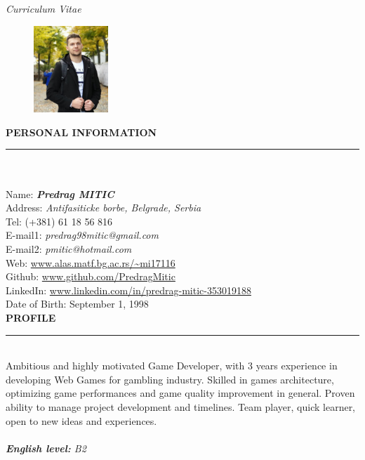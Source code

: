 \documentclass{article}
\begin{document}
\begin{center}
	\textit{\Huge Curriculum Vitae}   
	\vspace*{1cm}
\end{center}

\begin{figure} 
	\includegraphics[width=0.25\textwidth]{my_pic.jpeg}
\end{figure}

\color{my_col}
\textbf{\large PERSONAL INFORMATION}\\
\noindent\rule{10cm}{1.5pt}\color{black}\\ \\
Name:  \textbf{\emph{Predrag MITIC}} \\
Address: \emph{Antifasiticke borbe, Belgrade, Serbia }\\
Tel: 	(+381) 61 18 56 816 \\
E-mail1:	\textit{predrag98mitic@gmail.com} \\ 
E-mail2:	\textit{pmitic@hotmail.com} \\ 
Web:	\url{www.alas.matf.bg.ac.rs/~mi17116} \\
Github:	\url{www.github.com/PredragMitic} \\ 
LinkedIn: \url{www.linkedin.com/in/predrag-mitic-353019188}\\
Date of Birth: September 1, 1998 \\ 

\color{my_col}
\textbf{\large PROFILE}\\
\noindent\rule{15.4cm}{1.6pt}\color{black}\\ 
Ambitious and highly motivated Game Developer, with 3 years experience in developing Web Games for gambling industry. Skilled in games architecture, optimizing game performances and game quality improvement in general. Proven ability to manage project development and timelines. 
Team player, quick learner, open to new ideas and experiences.\\ \\
\textit{\textbf{English level: } B2}\\
\end{document}
